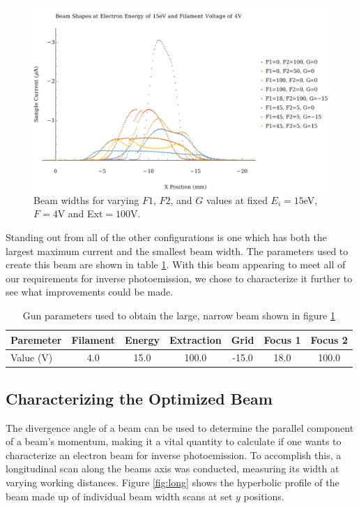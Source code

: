 \begin{figure}[h!]
    \centering
    \includegraphics[width=0.85\linewidth]{../Work Term Replication/Plots/param sweep.png}
	\caption{Beam widths for varying $F1$, $F2$, and $G$ values at fixed $E_i=15$eV, $F=4$V and Ext$=100$V.}
    \label{fig:workterm}
\end{figure}

Standing out from all of the other configurations is one which has both the largest maximum current and the smallest beam width. The parameters 
used to create this beam are shown in table \ref{tab:optparam}. With this beam appearing to meet all of our requirements for inverse photoemission, 
we chose to characterize it further to see what improvements could be made.

\begin{table}[h!]
	\centering
	\begin{tabular}{ccccccc}
		\hline
		\multicolumn{1}{l|}{Paremeter} & Filament & Energy & Extraction & Grid & Focus 1 & Focus 2 \\ \hline
		\multicolumn{1}{l|}{Value (V)} & 4.0 & 15.0 & 100.0 & -15.0 & 18.0 & 100.0 \\ \hline
	\end{tabular}
	\caption{Gun parameters used to obtain the large, narrow beam shown in figure \ref{fig:workterm}}
	\label{tab:optparam}
\end{table}

\clearpage
\subsection{Characterizing the Optimized Beam}

The divergence angle of a beam can be used to determine the parallel component of a beam's momentum, making it a vital quantity to calculate if 
one wants to characterize an electron beam for inverse photoemission. To accomplish this, a longitudinal scan along the beams axis was conducted, 
measuring its width at varying working distances. Figure \ref{fig:long} shows the hyperbolic profile of the beam made up of individual beam width 
scans at set $y$ positions. 

